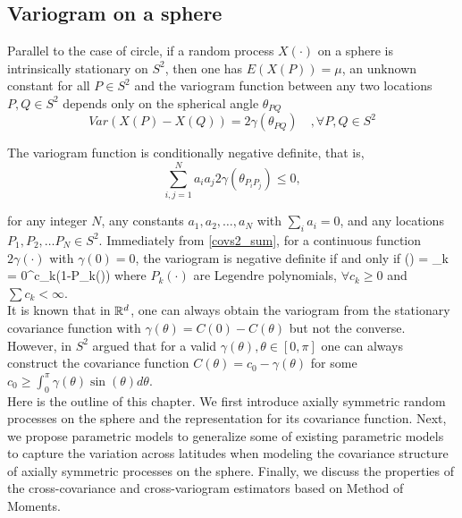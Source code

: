 		\subsection{Variogram on a sphere}
			
			
Parallel to the case of circle, if a random process $X(\cdot)$ on a sphere is intrinsically stationary on $S^2$, then one has $E(X(P))=\mu$, an unknown constant for all $P\in S^2$ and the variogram function between any two locations $P, Q \in S^2$ depends only on the spherical angle $\theta_{PQ}$			
		\[
			Var(X(P)-X(Q)) = 2\gamma(\theta_{PQ}) \quad , \forall P, Q \in S^2
		\]
			
		The variogram function is conditionally negative definite, that is,
		\[
			\sum_{i,j=1}^{N} a_i a_j 2\gamma(\theta_{P_iP_j}) \le 0,
		\]
			
for any integer $N$, any constants $a_1, a_2, \ldots, a_N$ with $\sum_i a_i = 0$, and any locations $P_1, P_2, \ldots P_N \in S^2$. Immediately from \ref{covs2_sum}, for a continuous function $2\gamma(\cdot)$ with $\gamma(0)=0$, the variogram is negative definite if and only if
		\beq
		\gamma(\theta) = \sum_{k = 0}^\infty c_k(1-P_k(\cos\theta))
		\eeq
where $P_{k}(\cdot)$ are Legendre polynomials, $\forall c_k\ge 0$ and $\sum c_k < \infty$. \\
			
It is known that in $\mathbb{R}^d$, one can always obtain the variogram from the stationary covariance function with $\gamma(\theta) = C(0) - C(\theta)$ but not the converse. However, in $S^2$ \cite{Yaglom1961} argued that for a valid $\gamma(\theta), \theta \in [0,\pi]$ one can always construct the covariance function $C(\theta)=c_0-\gamma(\theta)$ for some $c_0 \ge \int_0^{\pi} \gamma(\theta)\sin(\theta)d\theta$. \\
			
Here is the outline of this chapter. We first introduce axially symmetric random processes on the sphere and the representation for its covariance function. Next, we propose parametric models to generalize some of existing parametric models to capture the variation across latitudes when modeling the covariance structure of axially symmetric processes on the sphere. Finally, we discuss the properties of the cross-covariance and cross-variogram estimators based on Method of Moments.\\
		
